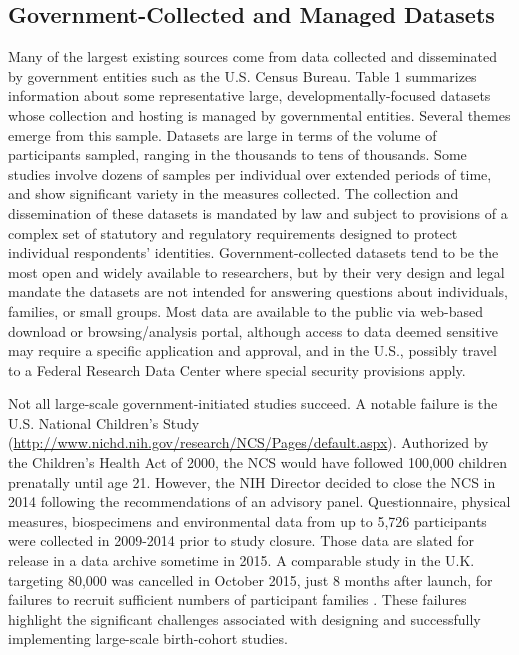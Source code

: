 \documentclass[letterpaper,man,apacite,natbib]{apa6}
\begin{document}
\subsection{Government-Collected and Managed Datasets}
Many of the largest existing sources come from data collected and disseminated by government entities such as the U.S. Census Bureau.
Table 1 summarizes information about some representative large, developmentally-focused datasets whose collection and hosting is managed by governmental entities.
Several themes emerge from this sample.
Datasets are large in terms of the volume of participants sampled, ranging in the thousands to tens of thousands.
Some studies involve dozens of samples per individual over extended periods of time, and show significant variety in the measures collected.
The collection and dissemination of these datasets is mandated by law and subject to provisions of a complex set of statutory and regulatory requirements designed to protect individual respondents' identities.
Government-collected datasets tend to be the most open and widely available to researchers, but by their very design and legal mandate the datasets are not intended for answering questions about individuals, families, or small groups.
Most data are available to the public via web-based download or browsing/analysis portal, although access to data deemed sensitive may require a specific application and approval, and in the U.S., possibly travel to a Federal Research Data Center where special security provisions apply.

Not all large-scale government-initiated studies succeed.
A notable failure is the U.S. National Children's Study (\url{http://www.nichd.nih.gov/research/NCS/Pages/default.aspx}).
Authorized by the Children's Health Act of 2000, the NCS would have followed 100,000 children prenatally until age 21.
However, the NIH Director decided to close the NCS in 2014 following the recommendations of an advisory panel. 
Questionnaire, physical measures, biospecimens and environmental data from up to 5,726 participants were collected in 2009-2014 prior to study closure.
Those data are slated for release in a data archive sometime in 2015.
A comparable study in the U.K. targeting 80,000 was cancelled in October 2015, just 8 months after launch, for failures to recruit sufficient numbers of participant families \cite{pearson_massive_2015}.
These failures highlight the significant challenges associated with designing and successfully implementing large-scale birth-cohort studies.
\end{document}
